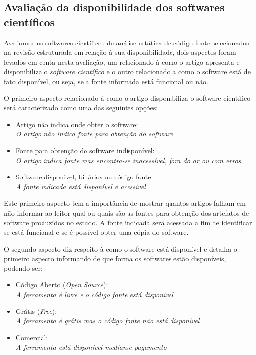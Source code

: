 \subsection{Avaliação da disponibilidade dos softwares científicos}

Avaliamos os softwares científicos de análise estática de código fonte selecionados
na revisão estruturada em relação à sua disponibilidade,
dois aspectos foram levados em conta nesta avaliação, um relacionado à como o
artigo apresenta e disponibiliza o {\it software científico} e
o outro relacionado a como o software está de fato disponível, ou seja, se a fonte
informada está funcional ou não.

O primeiro aspecto relacionado à como o artigo disponibiliza o software
científico será caracterizado como uma das seguintes opções:

\begin{itemize}
  \item Artigo não indica onde obter o software:\\
    {\it O artigo não indica fonte para obtenção do software}
  \item Fonte para obtenção do software indisponível:\\
    {\it O artigo indica fonte mas encontra-se inacessível, fora do ar ou com erros}
  \item Software disponivel, binários ou código fonte\\
    {\it A fonte indicada está disponível e acessível}
\end{itemize}

Este primeiro aspecto tem a importância de mostrar quantos artigos falham em
não informar ao leitor qual ou quais são as fontes para obtenção dos artefatos
de software produzidos no estudo. A fonte indicada será acessada a fim de
identificar se está funcional e se é possível obter uma cópia do software.


O segundo aspecto diz respeito à como o software está disponível e detalha o
primeiro aspecto informando de que forma os softwares estão disponíveis, podendo
ser:

\begin{itemize}
  \item Código Aberto ({\it Open Source}):\\
    {\it A ferramenta é livre e o código fonte está disponível}
  \item Grátis ({\it Free}):\\
    {\it A ferramenta é grátis mas o código fonte não está disponível}
  \item Comercial:\\
    {\it A ferramenta está disponível mediante pagamento}
\end{itemize}

